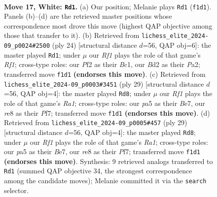 \documentclass[11pt]{article}
\begin{document}
\clearpage

\begin{figure}[p]\centering
\begin{subfigure}{0.46\textwidth}\centering
\resizebox{\linewidth}{!}{%
\newchessgame
\chessboard[
  setfen={rnb1r3/1p3ppp/1k2pn2/pNb5/P6P/1B2P3/1P1B1PP1/RN3RK1 w - - 11 17},
  showmover=false,
  pgfstyle=straightmove, color=movearrow, markmove={f1-d1}
]}
\caption{}
\end{subfigure}\hfill
\begin{subfigure}{0.46\textwidth}\centering
\resizebox{\linewidth}{!}{%
\newchessgame
\chessboard[
  setfen={r1b4r/pp2kppp/3bpn2/8/8/2P2N2/PPB2PPP/R1B2RK1 w - - 4 13},
  showmover=false,
  pgfstyle=straightmove, color=movearrow, markmove={f1-d1}
]}
\caption{}
\end{subfigure}
\\[4pt]
\begin{subfigure}{0.46\textwidth}\centering
\resizebox{\linewidth}{!}{%
\newchessgame
\chessboard[
  setfen={r3k2r/2p1bppp/p3b3/1pn1P3/8/5N2/PPB2PPP/R1BR2K1 b kq - 0 15},
  showmover=false,
  pgfstyle=straightmove, color=movearrow, markmove={a8-d8}
]}
\caption{}
\end{subfigure}\hfill
\begin{subfigure}{0.46\textwidth}\centering
\resizebox{\linewidth}{!}{%
\newchessgame
\chessboard[
  setfen={r3k2r/2p1bppp/p3b3/1pn1P3/8/5N2/PPB2PPP/R1BR2K1 b kq - 0 15},
  showmover=false,
  pgfstyle=straightmove, color=movearrow, markmove={a8-d8}
]}
\caption{}
\end{subfigure}
\caption{\textbf{Move 17, White: \texttt{Rd1}.} (a) Our position; Melanie plays \texttt{Rd1} (\texttt{f1d1}). Panels (b)--(d) are the retrieved master positions whose correspondence most drove this move (highest QAP objective among those that transfer to it). (b) Retrieved from \texttt{lichess\_elite\_2024-09\_p0024\#2500} (ply 24) [structural distance $d$=56, QAP obj=6]: the master played \texttt{Rd1}; under $\mu$ our \emph{Rf1} plays the role of that game's \emph{Rf1}; cross-type roles: our \emph{P}f2 as their \emph{B}c1, our \emph{B}d2 as their \emph{P}a2; transferred move \texttt{f1d1} \textbf{(endorses this move)}. (c) Retrieved from \texttt{lichess\_elite\_2024-09\_p0003\#3451} (ply 29) [structural distance $d$=56, QAP obj=4]: the master played \texttt{Rd8}; under $\mu$ our \emph{Rf1} plays the role of that game's \emph{Ra1}; cross-type roles: our \emph{p}a5 as their \emph{B}e7, our \emph{r}e8 as their \emph{P}f7; transferred move \texttt{f1d1} \textbf{(endorses this move)}. (d) Retrieved from \texttt{lichess\_elite\_2024-09\_p0005\#457} (ply 29) [structural distance $d$=56, QAP obj=4]: the master played \texttt{Rd8}; under $\mu$ our \emph{Rf1} plays the role of that game's \emph{Ra1}; cross-type roles: our \emph{p}a5 as their \emph{B}e7, our \emph{r}e8 as their \emph{P}f7; transferred move \texttt{f1d1} \textbf{(endorses this move)}. Synthesis: 9 retrieved analogs transferred to \texttt{Rd1} (summed QAP objective 34, the strongest correspondence among the candidate moves); Melanie committed it via the \texttt{search} selector.}
\label{fig:thought-m32}
\end{figure}
\end{document}
